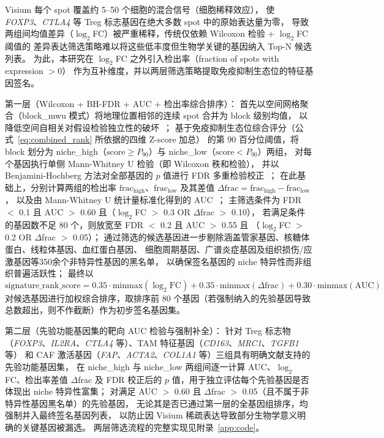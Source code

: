 \documentclass[12pt, a4paper]{ctexart}
\begin{document}
Visium 每个 spot 覆盖约 5--50 个细胞的混合信号（细胞稀释效应），
使 \textit{FOXP3}、\textit{CTLA4} 等 Treg 标志基因在绝大多数 spot 中的原始表达量为零，
导致两组间均值差异（$\log_2$FC）被严重稀释，传统仅依赖 Wilcoxon 检验 + $\log_2$FC 阈值的
差异表达筛选策略难以将这些低丰度但生物学关键的基因纳入 Top-N 候选列表。
为此，本研究在 $\log_2$FC 之外引入检出率（fraction of spots with expression $>0$）
作为互补维度，并以两层筛选策略提取免疫抑制生态位的特征基因签名。

第一层（Wilcoxon + BH-FDR + AUC + 检出率综合排序）：
首先以空间网格聚合（block\_mwu 模式）将地理位置相邻的连续 spot 合并为 block 级别均值，
以降低空间自相关对假设检验独立性的破坏~\citep{palla2022squidpy}；
基于免疫抑制生态位综合评分（公式~\ref{eq:combined_rank} 所依据的四维 Z-score 加总）
的第 90 百分位阈值，将 block 划分为
niche\_high（$\text{score} \geq P_{90}$）与 niche\_low（$\text{score} < P_{90}$）两组，
对每个基因执行单侧 Mann-Whitney U 检验（即 Wilcoxon 秩和检验），
并以 Benjamini-Hochberg 方法对全部基因的 $p$ 值进行 FDR 多重检验校正~\citep{mann1947test}；
在此基础上，分别计算两组的检出率 $\text{frac}_{\text{high}}$、$\text{frac}_{\text{low}}$
及其差值 $\Delta\text{frac} = \text{frac}_{\text{high}} - \text{frac}_{\text{low}}$，
以及由 Mann-Whitney U 统计量标准化得到的 AUC~\citep{hanley1982meaning}；
主筛选条件为 FDR $<$ 0.1 且 AUC $>$ 0.60 且（$\log_2$FC $>$ 0.3 OR $\Delta$frac $>$ 0.10），
若满足条件的基因数不足 80 个，则放宽至 FDR $<$ 0.2 且 AUC $>$ 0.55 且
（$\log_2$FC $>$ 0.2 OR $\Delta$frac $>$ 0.05）；
通过筛选的候选基因进一步剔除涵盖管家基因、核糖体蛋白、线粒体基因、血红蛋白基因、
细胞周期基因、广谱炎症基因及组织损伤/应激基因等350余个非特异性基因的黑名单，
以确保签名基因的 niche 特异性而非组织普遍活跃性；
最终以
\begin{equation*}
\text{signature\_rank\_score} = 0.35 \cdot \text{minmax}(\log_2\text{FC}) + 0.35 \cdot \text{minmax}(\Delta\text{frac}) + 0.30 \cdot \text{minmax}(\text{AUC})
\label{eq:signature_rank_score}
\end{equation*}
对候选基因进行加权综合排序，取排序前 80 个基因（若强制纳入的先验基因导致总数超出，则不作截断）作为初步签名基因集。

第二层（先验功能基因集的靶向 AUC 检验与强制补全）：
针对 Treg 标志物（\textit{FOXP3}、\textit{IL2RA}、\textit{CTLA4} 等）、TAM 特征基因（\textit{CD163}、\textit{MRC1}、\textit{TGFB1} 等）
和 CAF 激活基因（\textit{FAP}、\textit{ACTA2}、\textit{COL1A1} 等）三组具有明确文献支持的先验功能基因集，
在 niche\_high 与 niche\_low 两组间逐一计算 AUC、$\log_2$FC、检出率差值 $\Delta$frac 及
FDR 校正后的 $p$ 值，用于独立评估每个先验基因是否体现出 niche 特异性富集；
对满足 AUC $>$ 0.60 且 $\Delta$frac $>$ 0.05（且不属于非特异性基因黑名单）的先验基因，
无论其是否已通过第一层的全基因组排序，均强制并入最终签名基因列表，
以防止因 Visium 稀疏表达导致部分生物学意义明确的关键基因被漏选。
两层筛选流程的完整实现见附录~\ref{app:code}。
\end{document}
